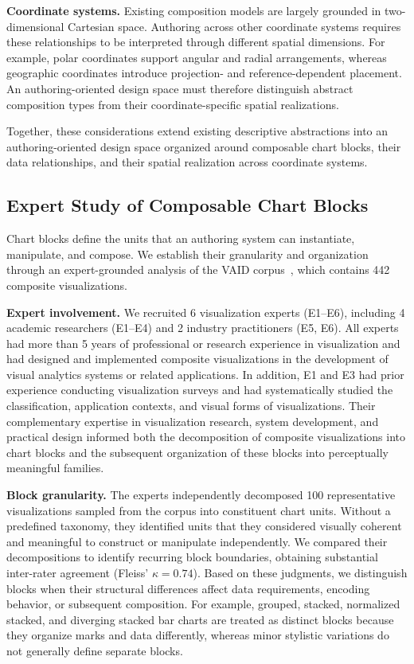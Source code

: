 \textbf{Coordinate systems.}
Existing composition models are largely grounded in two-dimensional Cartesian
space. Authoring across other coordinate systems requires
these relationships to be interpreted through different spatial dimensions.
For example, polar coordinates support angular and radial arrangements,
whereas geographic coordinates introduce projection- and
reference-dependent placement. An authoring-oriented design space must
therefore distinguish abstract composition types from their
coordinate-specific spatial realizations.

Together, these considerations extend existing descriptive abstractions into
an authoring-oriented design space organized around composable chart blocks,
their data relationships, and their spatial realization across coordinate
systems.

\subsection{Expert Study of Composable Chart Blocks}
Chart blocks define the units that an authoring system can instantiate,
manipulate, and compose. We establish their granularity and organization
through an expert-grounded analysis of the VAID corpus~\cite{vaid}, which
contains 442 composite visualizations.

\textbf{Expert involvement.}
We recruited 6 visualization experts (E1--E6), including 4 academic
researchers (E1--E4) and 2 industry practitioners (E5, E6). All experts had
more than 5 years of professional or research experience in visualization
and had designed and implemented composite visualizations in the development
of visual analytics systems or related applications. In addition, E1 and E3
had prior experience conducting visualization surveys and had systematically
studied the classification, application contexts, and visual forms of
visualizations. Their complementary expertise in visualization research,
system development, and practical design informed both the decomposition of
composite visualizations into chart blocks and the subsequent organization of
these blocks into perceptually meaningful families.

\textbf{Block granularity.}
The experts independently decomposed 100 representative visualizations sampled
from the corpus into constituent chart units. Without a predefined taxonomy,
they identified units that they considered visually coherent and meaningful
to construct or manipulate independently. We compared their decompositions to
identify recurring block boundaries, obtaining substantial inter-rater
agreement (Fleiss' $\kappa=0.74$). Based on these judgments, we distinguish
blocks when their structural differences affect data requirements, encoding
behavior, or subsequent composition. For example, grouped, stacked,
normalized stacked, and diverging stacked bar charts are treated as distinct
blocks because they organize marks and data differently, whereas minor
stylistic variations do not generally define separate blocks.

